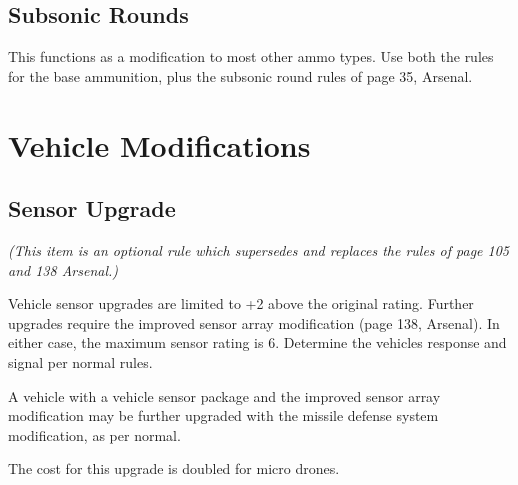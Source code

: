 \documentclass{article}
\begin{document}
\subsection*{Subsonic Rounds}

  This functions as a modification to most other ammo types.  Use both the rules for the base ammunition, plus the subsonic round rules of page 35, Arsenal.

\section*{Vehicle Modifications}

\subsection*{Sensor Upgrade}

\emph{(This item is an optional rule which supersedes and replaces the rules of page 105 and 138 Arsenal.)}

 Vehicle sensor upgrades are limited to +2 above the original rating. Further upgrades require the improved sensor array modification (page 138, Arsenal).  In either case, the maximum sensor rating is 6. Determine the vehicles response and signal per normal rules.

 A vehicle with a vehicle sensor package and the improved sensor array modification may be further upgraded with the missile defense system modification, as per normal.

 The cost for this upgrade is doubled for micro drones.

\onecolumn
\end{document}
